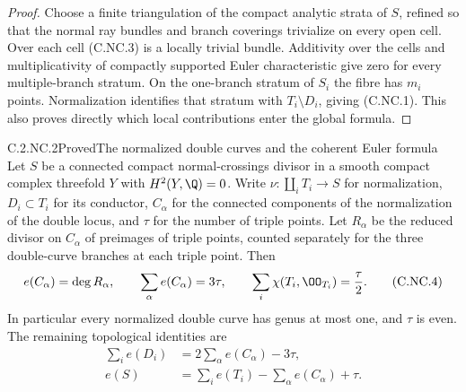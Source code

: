 \begin{proof}
Choose a finite triangulation of the compact analytic strata of $S$, refined so that the normal ray bundles and branch coverings trivialize on every open cell. Over each cell (C.NC.3) is a locally trivial bundle. Additivity over the cells and multiplicativity of compactly supported Euler characteristic give zero for every multiple-branch stratum. On the one-branch stratum of $S_i$ the fibre has $m_i$ points. Normalization identifies that stratum with $T_i\setminus D_i$, giving (C.NC.1). This also proves directly which local contributions enter the global formula.
\end{proof}

\begin{statement}{C.2.NC.2}{Proved}{The normalized double curves and the coherent Euler formula}
Let $S$ be a connected compact normal-crossings divisor in a smooth compact complex threefold $Y$ with $H^2(Y,\Q)=0$. Write $\nu:\coprod_iT_i\to S$ for normalization, $D_i\subset T_i$ for its conductor, $C_\alpha$ for the connected components of the normalization of the double locus, and $\tau$ for the number of triple points. Let $R_\alpha$ be the reduced divisor on $C_\alpha$ of preimages of triple points, counted separately for the three double-curve branches at each triple point. Then
\[
 e(C_\alpha)=\deg R_\alpha,\qquad
 \sum_\alpha e(C_\alpha)=3\tau,
 \qquad
 \sum_i\chi(T_i,\OO_{T_i})=\frac{\tau}{2}.
 \tag{C.NC.4}
\]
In particular every normalized double curve has genus at most one, and $\tau$ is even. The remaining topological identities are
\[
\begin{aligned}
 \sum_i e(D_i)&=2\sum_\alpha e(C_\alpha)-3\tau,\\
 e(S)&=\sum_i e(T_i)-\sum_\alpha e(C_\alpha)+\tau.
\end{aligned}
 \tag{C.NC.5}
\]
\end{statement}
